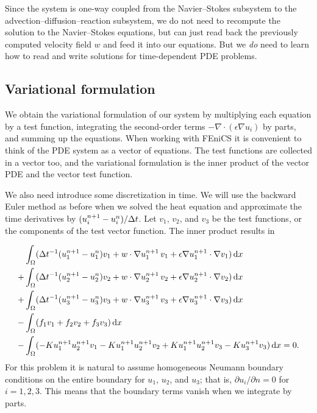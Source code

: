 \documentclass[graybox,envcountchap,sectrefs,final]{svmonodo}
\begin{document}
Since the system is one-way coupled from the Navier--Stokes subsystem
to the advection--diffusion--reaction subsystem, we do not need to
recompute the solution to the Navier--Stokes equations, but can just
read back the previously computed velocity field $w$ and feed it into
our equations. But we \emph{do} need to learn how to read and write
solutions for time-dependent PDE problems.

\subsection{Variational formulation}

We obtain the variational formulation of our system by multiplying
each equation by a test function, integrating the second-order terms
$-\nabla\cdot(\epsilon\nabla u_i)$ by parts, and summing up the
equations. When working with FEniCS it is convenient to think of the
PDE system as a vector of equations. The test functions are collected in
a vector too, and the variational formulation is the inner product of
the vector PDE and the vector test function.

We also need introduce some discretization in time. We will use the
backward Euler method as before when we solved the heat equation and
approximate the time derivatives by $(u_i^{n+1}-u_i^n) / \Delta t$. Let
$v_1$, $v_2$, and $v_3$ be the test functions, or the components of
the test vector function. The inner product results in

\begin{align}
  \label{ftut1:reactionsystem:varproblem}
  & \int_{\Omega}
  (\Delta t^{-1} (u_1^{n+1} - u_1^n) v_1 + w \cdot \nabla u^{n+1}_1 \, v_1
  + \epsilon \nabla u^{n+1}_1 \cdot \nabla v_1) \, \mathrm{d}x \\
  + & \int_{\Omega} (\Delta t^{-1} (u_2^{n+1} - u_2^n) v_2
  + w \cdot \nabla u^{n+1}_2 \, v_2
  + \epsilon \nabla u^{n+1}_2 \cdot \nabla v_2) \, \mathrm{d}x \nonumber \\
  + & \int_{\Omega} (\Delta t^{-1} (u_3^{n+1} - u_3^n) v_3
  + w \cdot \nabla u^{n+1}_3 \, v_3
  + \epsilon \nabla u^{n+1}_3 \cdot \nabla v_3) \, \mathrm{d}x \nonumber \\
  - & \int_{\Omega} (f_1 v_1 + f_2 v_2 + f_3 v_3) \, \mathrm{d}x \nonumber \\
  - & \int_{\Omega} (-K u^{n+1}_1 u^{n+1}_2 v_1 - K u^{n+1}_1
  u^{n+1}_2 v_2 + K u^{n+1}_1 u^{n+1}_2 v_3 - K u^{n+1}_3 v_3) \, \mathrm{d}x = 0.
  \nonumber
\end{align}
For this problem it is natural to assume homogeneous Neumann boundary
conditions on the entire boundary for $u_1$, $u_2$, and $u_3$; that
is, $\partial u_i/\partial n = 0$ for $i = 1, 2, 3$. This means that
the boundary terms vanish when we integrate by parts.
\end{document}
